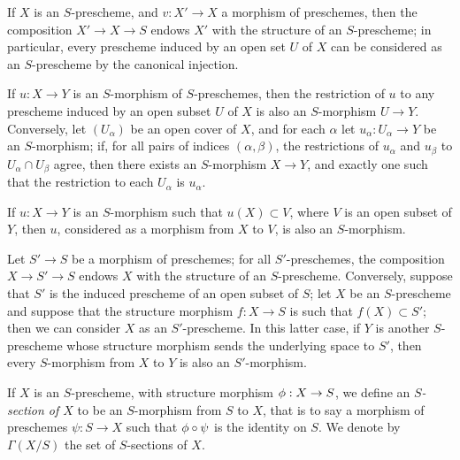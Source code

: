 \begin{env}[2.5.3]
\label{1.2.5.3}
If $X$ is an $S$-prescheme, and $v:X'\to X$ a morphism of preschemes, then the composition $X'\to X\to S$ endows $X'$ with the structure of an $S$-prescheme;
in particular, every prescheme induced by an open set $U$ of $X$ can be considered as an $S$-prescheme by the canonical injection.

If $u:X\to Y$ is an $S$-morphism of $S$-preschemes, then the restriction of $u$ to any prescheme induced by an open subset $U$ of $X$ is also an $S$-morphism $U\to Y$.
Conversely, let $(U_\alpha)$ be an open cover of $X$, and for each $\alpha$ let $u_\alpha:U_\alpha\to Y$ be an $S$-morphism;
if, for all pairs of indices $(\alpha,\beta)$, the restrictions of $u_\alpha$ and $u_\beta$ to $U_\alpha\cap U_\beta$ agree, then there exists an $S$-morphism $X\to Y$, and exactly one such that the restriction to each $U_\alpha$ is $u_\alpha$.

If $u:X\to Y$ is an $S$-morphism such that $u(X)\subset V$, where $V$ is an open subset of $Y$, then $u$, considered as a morphism from $X$ to $V$, is also an $S$-morphism.
\end{env}

\begin{env}[2.5.4]
\label{1.2.5.4}
Let $S'\to S$ be a morphism of preschemes;
for all $S'$-preschemes, the composition $X\to S'\to S$ endows $X$ with the structure of an $S$-prescheme.
Conversely, suppose that $S'$ is the induced prescheme of an open subset of $S$;
let $X$ be an $S$-prescheme and suppose that the structure morphism $f:X\to S$ is such that $f(X)\subset S'$;
then we can consider $X$ as an $S'$-prescheme.
In this latter case, if $Y$ is another $S$-prescheme whose structure morphism sends the underlying space to $S'$, then every $S$-morphism from $X$ to $Y$ is also an $S'$-morphism.
\end{env}

\begin{env}[2.5.5]
\label{1.2.5.5}
If $X$ is an $S$-prescheme, with structure morphism $\vphi:X\to S$, we define an \emph{$S$-section of $X$} to be an $S$-morphism from $S$ to $X$, that is to say a morphism of preschemes $\psi:S\to X$ such that $\phi\circ\psi$ is the identity on $S$.
We denote by $\Gamma(X/S)$ the set of $S$-sections of $X$.
\end{env}

